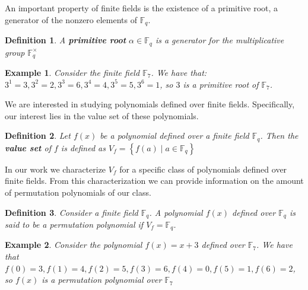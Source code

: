 \documentclass[landscape,final,paperwidth=48in,paperheight=38in]{baposter}
\newtheorem{example}{Example}
\newtheorem{definition}{Definition}
\begin{document}
\begin{poster}
{An important property of finite fields is the existence of a primitive root, a generator of the nonzero elements of $\mathbb{F}_q$.

\begin{definition}
  A \textbf{primitive root} $\alpha \in \mathbb{F}_q$ is a generator for the multiplicative group $\mathbb{F}_{q}^{\times}$
\end{definition}

\begin{example}
  Consider the finite field $\mathbb{F}_{7}$. We have that: $3^1 = 3, 3^2 = 2, 3^3 = 6, 3^4 = 4, 3^5 = 5, 3^6 = 1$, so $3$ is a primitive root of $\mathbb{F}_{7}$.
\end{example}

We are interested in studying polynomials defined over finite fields. Specifically, our interest lies in the value set of these polynomials.

\begin{definition}
  Let $f(x)$ be a polynomial defined over a finite field $\mathbb{F}_{q}$. Then the \textbf{value set} of $f$ is defined as $V_{f} = \left\{f(a) \mid a \in \mathbb{F}_{q} \right\}$
\end{definition}

In our work we characterize $V_{f}$ for a specific class of polynomials defined over finite fields. From this characterization we can provide information on the amount of permutation polynomials of our class.

\begin{definition}
  Consider a finite field $\mathbb{F}_{q}$. A polynomial $f(x)$ defined over $\mathbb{F}_{q}$ is said to be a permutation polynomial if $V_{f} = \mathbb{F}_{q}$.
\end{definition}

\begin{example}
  Consider the polynomial $f(x) = x+3$ defined over $\mathbb{F}_{7}$. We have that $f(0) = 3, f(1) = 4, f(2) = 5, f(3) = 6, f(4) = 0, f(5) = 1, f(6) = 2$, so $f(x)$ is a permutation polynomial over $\mathbb{F}_{7}$
\end{example}

   \vspace{0.3em}
}\label{Preliminaries}

\end{poster}
\end{document}
